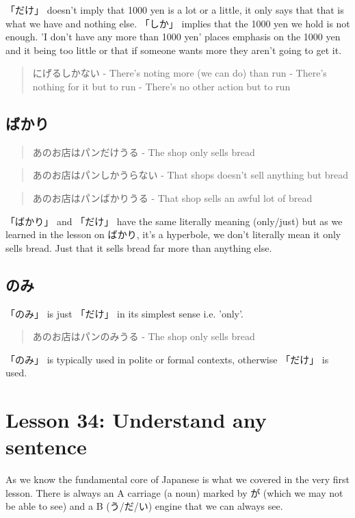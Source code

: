 \documentclass[11pt]{article}
\begin{document}
「だけ」 doesn't imply that 1000 yen is a lot or a little, it only says that that is what we have and nothing else. 「しか」 implies that the 1000 yen we hold is not enough. 'I don't have any more than 1000 yen' places emphasis on the 1000 yen and it being too little or that if someone wants more they aren't going to get it.

\begin{quote}
にげるしかない - There's noting more (we can do) than run - There's nothing for it but to run - There's no other action but to run
\end{quote}

\subsection{ばかり}
\label{sec:orgc0e21ee}
\begin{quote}
あのお店はパンだけうる - The shop only sells bread
\end{quote}
\begin{quote}
あのお店はパンしかうらない - That shops doesn't sell anything but bread
\end{quote}
\begin{quote}
あのお店はパンばかりうる - That shop sells an awful lot of bread
\end{quote}
「ばかり」 and 「だけ」 have the same literally meaning (only/just) but as we learned in the lesson on ばかり, it's a hyperbole, we don't literally mean it only sells bread. Just that it sells bread far more than anything else.

\subsection{のみ}
\label{sec:org93324f6}
「のみ」 is just 「だけ」 in its simplest sense i.e. 'only'.
\begin{quote}
あのお店はパンのみうる - The shop only sells bread
\end{quote}
「のみ」 is typically used in polite or formal contexts, otherwise 「だけ」 is used.
\section{Lesson 34: Understand any sentence}
\label{sec:org21023bf}
As we know the fundamental core of Japanese is what we covered in the very first lesson. There is always an A carriage (a noun) marked by が (which we may not be able to see) and a B (う/だ/い) engine that we can always see.
\end{document}
